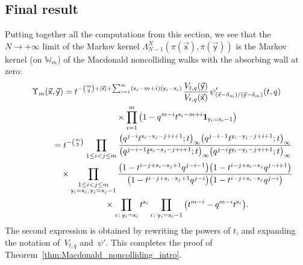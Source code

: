 \subsection{Final result}

Putting together all the computations from this section, we see that the
$N\to+\infty$ limit of the Markov kernel $\Lambda^{N}_{N-1}(\pi(\vec{\mathsf{x}}),
\overline\pi(\vec{\mathsf{y}}))$ is the Markov kernel (on $\mathbb{W}_m$)
of the Macdonald noncolliding walks with the absorbing wall at zero:
\begin{gather}
	\nonumber
	\Upsilon_m(\vec{\mathsf{x}},\vec{\mathsf{y}}) =
	t^{-\binom m2+|\vec{\mathsf{x}}|
	+\sum_{i=1}^{m}
	(\mathsf{x}_{i}-m+i)(\mathsf{y}_{i}-\mathsf{x}_{i})}	
	\hspace{1pt}
	\frac{V_{t,q}(\vec{\mathsf{y}})}{V_{t,q}(\vec{\mathsf{x}})}
	\hspace{1pt}
	\psi'_{(\vec{\mathsf{x}}-\delta_m)/(\vec{\mathsf{y}}-\delta_m)}(t,q)
	\\
\hphantom{\Upsilon_m(\vec{\mathsf{x}},\vec{\mathsf{y}})=}{}	
\times
	\prod_{i=1}^{m}
	\big( 1-q^{m-i}t^{\mathsf{x}_i-m+i}\mathbf{1}_{\mathsf{y}_i=\mathsf{x}_i-1}\big)\nonumber
	\\
	\nonumber
\hphantom{\Upsilon_m(\vec{\mathsf{x}},\vec{\mathsf{y}})}{}	
=
	t^{-\binom m2}	
	\hspace{1pt}
	\prod_{1\le i<j\le m}
	\frac
	{
		\big(q^{j-i} t^{\mathsf{x}_i-\mathsf{x}_j-j+i+1};t\big)_{\infty}
		\big( q^{j-i-1}t^{\mathsf{y}_i-\mathsf{y}_j-j+i+1};t \big)_{\infty}
	}
	{
		\big( q^{j-i-1}t^{\mathsf{x}_i-\mathsf{x}_j-j+i+1};t \big)_{\infty}
		\big(q^{j-i} t^{\mathsf{y}_i-\mathsf{y}_j-j+i+1};t\big)_{\infty}
	}
	\\
\hphantom{\Upsilon_m(\vec{\mathsf{x}},\vec{\mathsf{y}})=}{}	\times
\nonumber
	\prod_{\substack{1\le i<j\le m
	\\
	\mathsf{y}_{i}=\mathsf{x}_{i}
	,\,
	\mathsf{y}_{j}=\mathsf{x}_{j}-1}}
	\frac{\big(1-t^{i-j+\mathsf{x}_{i}-\mathsf{x}_{j}+1}
	q^{j-i-1}\big)
	\big(1-t^{i-j+\mathsf{x}_{i}-\mathsf{x}_{j}} q^{j-i+1}\big)}
	{\big(1-t^{i-j+\mathsf{x}_{i}-\mathsf{x}_{j}+1} q^{j-i}\big)
	\big(1-t^{i-j+\mathsf{x}_{i}-\mathsf{x}_{j}} q^{j-i}\big)}
	\\
\hphantom{\Upsilon_m(\vec{\mathsf{x}},\vec{\mathsf{y}})=}{}	\times
	\prod_{i\colon \mathsf{y}_i=\mathsf{x}_i}
	t^{\mathsf{x}_i}
	\prod_{i\colon \mathsf{y}_i=\mathsf{x}_i-1}
	\big(t^{m-i}-q^{m-i}t^{\mathsf{x}_i}\big)
	.\label{eq:Upsilon_final_formula}
\end{gather}
The second expression is obtained by rewriting the
powers of $t$, and expanding the notation of~$V_{t,q}$ and~$\psi'$.
This completes the proof of Theorem~\ref{thm:Macdonald_noncolliding_intro}.
